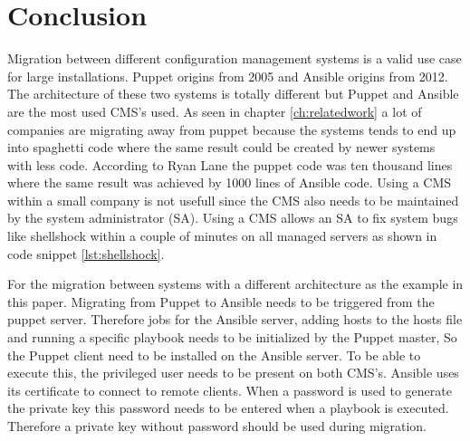 \section{Conclusion}\label{sec:conclusion}
Migration between different configuration management systems is a valid use case for large installations. Puppet origins from 2005 and Ansible origins from 2012. The architecture of these two systems is totally different but Puppet and Ansible are the most used CMS's used. As seen in chapter \ref{ch:relatedwork} a lot of companies are migrating away from puppet because the systems tends to end up into spaghetti code \cite{movingawayfrompuppet} where the same result could be created by newer systems with less code. According to Ryan Lane \cite{movingawayfrompuppet} the puppet code was ten thousand lines where the same result was achieved by 1000 lines of Ansible code. Using a CMS within a small company is not usefull since the CMS also needs to be maintained by the system administrator (SA). Using a CMS allows an SA to fix system bugs like shellshock within a couple of minutes on all managed servers as shown in code snippet \ref{lst:shellshock}.

For the migration between systems with a different architecture as the example in this paper. Migrating from Puppet to Ansible needs to be triggered from the puppet server. Therefore jobs for the Ansible server, adding hosts to the hosts file and running a specific playbook needs to be initialized by the Puppet master, So the Puppet client need to be installed on the Ansible server. To be able to execute this, the privileged user needs to be present on both CMS's. Ansible uses its certificate to connect to remote clients. When a password is used to generate the private key this password needs to be entered when a playbook is executed. Therefore a private key without password should be used during migration.   




